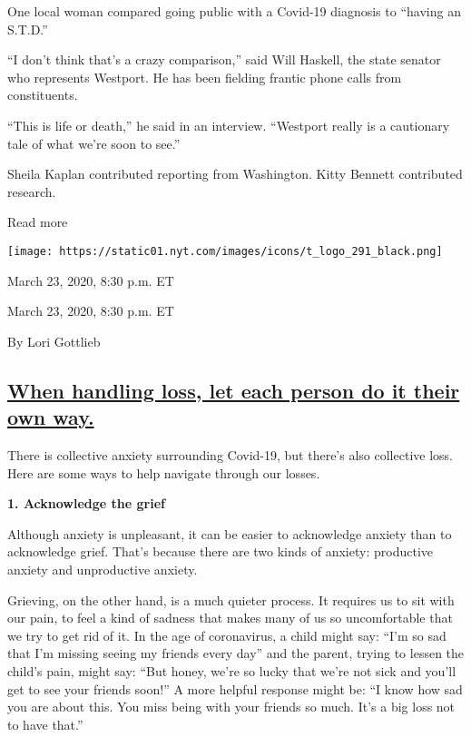 One local woman compared going public with a Covid-19 diagnosis to
``having an S.T.D.''

``I don't think that's a crazy comparison,'' said Will Haskell, the
state senator who represents Westport. He has been fielding frantic
phone calls from constituents.

``This is life or death,'' he said in an interview. ``Westport really is
a cautionary tale of what we're soon to see.''

Sheila Kaplan contributed reporting from Washington. Kitty Bennett
contributed research.

Read more

\texttt{[image: https://static01.nyt.com/images/icons/t\_logo\_291\_black.png]}

March 23, 2020, 8:30 p.m. ET

March 23, 2020, 8:30 p.m. ET

By Lori Gottlieb

\hypertarget{when-handling-loss-let-each-person-do-it-their-own-way}{%
\subsection{\texorpdfstring{\protect\hyperlink{when-handling-loss-let-each-person-do-it-their-own-way}{When
handling loss, let each person do it their own
way.}}{When handling loss, let each person do it their own way.}}\label{when-handling-loss-let-each-person-do-it-their-own-way}}

There is collective anxiety surrounding Covid-19, but there's also
collective loss. Here are some ways to help navigate through our losses.

\textbf{1. Acknowledge the grief}

Although anxiety is unpleasant, it can be easier to acknowledge anxiety
than to acknowledge grief. That's because there are two kinds of
anxiety: productive anxiety and unproductive anxiety.

Grieving, on the other hand, is a much quieter process. It requires us
to sit with our pain, to feel a kind of sadness that makes many of us so
uncomfortable that we try to get rid of it. In the age of coronavirus, a
child might say: ``I'm so sad that I'm missing seeing my friends every
day'' and the parent, trying to lessen the child's pain, might say:
``But honey, we're so lucky that we're not sick and you'll get to see
your friends soon!'' A more helpful response might be: ``I know how sad
you are about this. You miss being with your friends so much. It's a big
loss not to have that.''


